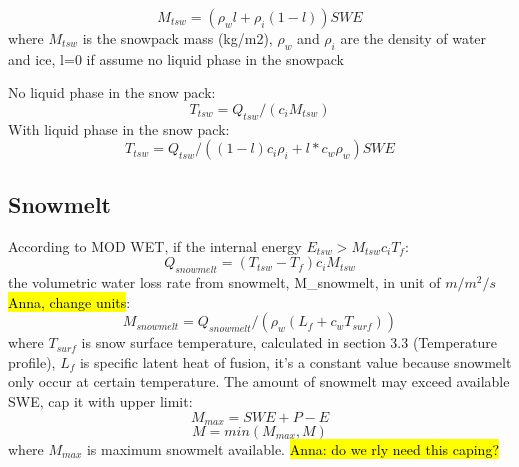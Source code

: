 \documentclass{article}
\begin{document}
\begin{equation}
M_{tsw}=(\rho_w l+\rho_i (1-l))SWE
\end{equation}
where $M_{tsw}$ is the snowpack mass (kg/m2), $\rho_w$ and $\rho_i$ are the density of water and ice, l=0 if assume no liquid phase in the snowpack

No liquid phase in the snow pack:
\begin{equation}
T_{tsw} = Q_{tsw} / (c_iM_{tsw}) 
\end{equation}
With liquid phase in the snow pack:
\begin{equation}
T_{tsw} = Q_{tsw} / ((1-l)c_i\rho_i+l*c_w\rho_w)SWE 
\end{equation}

\subsection{Snowmelt}
According to MOD WET, if the internal energy $E_{tsw} > M_{tsw}  c_i  T_f$:
\begin{equation}
Q_{snowmelt} = (T_{tsw}-T_f)c_i M_{tsw}
\end{equation}the volumetric water loss rate from snowmelt, M_{snowmelt}, in unit of $m/m^2/s$ \hl{Anna, change units}:
\begin{equation}
M_{snowmelt} = Q_{snowmelt} /(\rho_w (L_f+c_wT_{surf}))
\end{equation}where $T_{surf}$ is snow surface temperature, calculated in section 3.3 (Temperature profile), $L_f$ is specific latent heat of fusion, it's a constant value because snowmelt only occur at certain temperature. 
The amount of snowmelt may exceed available SWE, cap it with upper limit:
\begin{equation}
M_{max}  = SWE + P - E
\end{equation}\begin{equation}
M = min(M_{max} , M)
\end{equation}where $M_{max}$ is maximum snowmelt available.
\hl{Anna: do we rly need this caping?}
\end{document}
